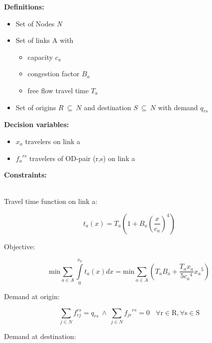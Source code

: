 \documentclass[a4paper, 12pt]{article}
\begin{document}
\vspace{5mm}
\begin{large}\textbf{Definitions:}\end{large}
\begin{itemize}
\item Set of Nodes \textit{N}
\item Set of links A with
\begin{itemize}
\item capacity $c_{a}$
\item congestion factor $B_{a}$
\item free flow travel time $T_{a}$
\end{itemize}
\item Set of origins $R\ \subseteq\ N$ and destination $S\ \subseteq\ N$ with demand $q_{rs}$ 
\end{itemize}
\begin{large}\textbf{Decision variables:}\end{large}
\begin{itemize}
\item $x_{a}$ travelers on link a
\item ${f_{a}}^{rs}$ travelers of OD-pair (r,s) on link a
\end{itemize}
\begin{large}\textbf{Constraints:}\end{large}\\
Travel time function on link a: 
\begin{large}
\boldmath\begin{equation*}
t_{a}\left(x\right) = T_{a}\left(1+B_{a}\left(\frac{x}{c_a}\right)^4\right)
\end{equation*}
\end{large}
Objective:
\begin{large}
\boldmath\begin{equation*}
\mathrm{min}\sum_{a\in{A}} \int\limits_{0}^{x_a}t_{a}\left(x\right)dx = \mathrm{min}\sum_{a\in{A}}\left(T_{a}B_{a}+\frac{T_{a}x_{a}}{5{c_{a}}^4}{x_{a}}^5\right) 
\end{equation*}
\end{large}
Demand at origin: 
\begin{large}
\boldmath\begin{equation*}
\sum_{j\in{N}} f_{rj}^{rs} = q_{rs}\  \wedge \ \sum_{j\in{N}} {f_{jr}}^{rs} = 0 \ \ \ \ \mathrm{\forall{r}\in{R},\forall{s}\in{S}} 
\end{equation*}
\end{large}
Demand at destination: 
\end{document}
